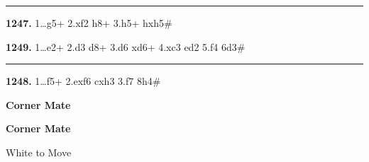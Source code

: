 \documentclass[12pt,twoside]{article}
\begin{document}
\noindent\rule{\textwidth}{0.4pt}

\vspace{0.15em}

\noindent{}

\vspace{0.75em}

{\footnotesize\sloppy
\noindent
\begin{minipage}[t]{\textwidth}
    \begin{minipage}[c]{0.47\textwidth}
{\bfseries 1247.} 1\ldots \symrook{}g5+ 2.\symbishop{}xf2 \symrook{}h8+ 3.\symbishop{}h5+ \symrook{}hxh5\#
        \vspace{0.45em}

{\bfseries 1249.} 1\ldots \symrook{}e2+ 2.\symking{}d3 \symrook{}d8+ 3.\symknight{}d6 \symrook{}xd6+ 4.\symking{}xc3 \symrook{}ed2 5.f4 \symrook{}6d3\#    \end{minipage}
        \hfill
    \begin{minipage}[c][4.9\baselineskip][c]{0.02\textwidth}
        \centering\rule{0.4pt}{4.7\baselineskip}
    \end{minipage}
    \hfill
    \begin{minipage}[c]{0.47\textwidth}
{\bfseries 1248.} 1\ldots f5+ 2.exf6 \symrook{}cxh3 3.f7 \symrook{}8h4\#
        \vspace{0.45em}

    \end{minipage}
\end{minipage}
}
\newpage\cleardoublepage

\thispagestyle{empty}

\vspace*{0.34\textheight}

\begin{center}
{\Huge\bfseries Corner Mate\par}
\end{center}

\vfill
{}
\newpage\null\thispagestyle{empty}\newpage

\begin{center}
\Large\bfseries Corner Mate

\vspace{0.15em}
\normalsize White to Move
\end{center}

\vspace{0.35em}
\end{document}
